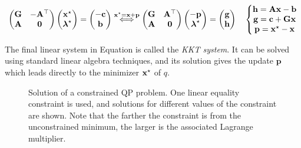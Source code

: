 \begin{equation}
  \label{eq:chap3-qp-kkt}
  \left(\begin{matrix}
    \mathbf{G} & -\mathbf{A}^{\top} \\
    \mathbf{A} & \mathbf{0}
  \end{matrix}\right)
  \left(\begin{matrix}
    \mathbf{x}^{\star} \\
    \boldsymbol{\lambda}^{\star}
  \end{matrix}\right)
  = \left(\begin{matrix}
    -\mathbf{c} \\
    \mathbf{b}
  \end{matrix}\right)  
  \overset{\mathbf{x}^{\star}=\mathbf{x}+\mathbf{p}}\Longleftrightarrow
  \left(\begin{matrix}
    \mathbf{G} & \mathbf{A}^{\top} \\
    \mathbf{A} & \mathbf{0} \\
  \end{matrix}\right)
  \left(\begin{matrix}
    -\mathbf{p} \\
    \boldsymbol{\lambda}^{\star}
  \end{matrix}\right)
  = \left(\begin{matrix}
    \mathbf{g} \\
    \mathbf{h}
  \end{matrix}\right)
  \quad
  \left\{\begin{matrix}
      \mathbf{h} = \mathbf{A}\mathbf{x} - \mathbf{b} \\
      \mathbf{g} = \mathbf{c} + \mathbf{G}\mathbf{x} \\
      \mathbf{p} = \mathbf{x}^{\star} - \mathbf{x}
    \end{matrix}\right.
\end{equation}

The final linear system in Equation  is called
the \emph{KKT system}. It can be solved using standard linear algebra
techniques, and its solution gives the update $\mathbf{p}$ which leads
directly to the minimizer $\mathbf{x}^{\star}$ of $q$.

\begin{figure}
      \caption[Solution of a constrained QP problem.]{Solution of a
        constrained QP problem. One linear equality constraint is
        used, and solutions for different values of the constraint are
        shown. Note that the farther the constraint is from the
        unconstrained minimum, the larger is the associated Lagrange
        multiplier.}
      \label{fig:chap3-qp-equality}
\end{figure}

